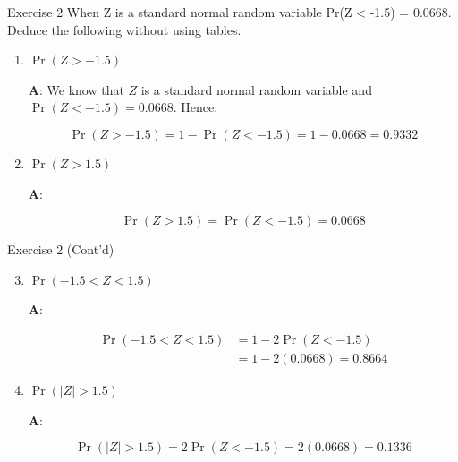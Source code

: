 \documentclass[
  ignorenonframetext,
  aspectratio=43,
]{beamer}
\let\olditem\item
\renewcommand\item{\olditem\justifying}
\begin{document}
\begin{frame}{Exercise 2}
\protect\hypertarget{exercise-2}{}
When Z is a standard normal random variable Pr(Z \textless{} -1.5) =
0.0668. Deduce the following without using tables.

\begin{enumerate}
\item
  \(\Pr(Z > -1.5)\)

  \pause

  \textbf{A}: We know that \(Z\) is a standard normal random variable
  and \(\Pr(Z < -1.5) = 0.0668\). Hence: \vspace{-15pt}

  \[
  \Pr(Z > -1.5) = 1 - \Pr(Z < -1.5) = 1 - 0.0668 = 0.9332
  \]
\item
  \(\Pr(Z > 1.5)\)

  \pause

  \textbf{A}: \vspace{-15pt}

  \[  
  \Pr(Z > 1.5) = \Pr(Z < -1.5) = 0.0668
  \]
\end{enumerate}
\end{frame}

\begin{frame}{Exercise 2 (Cont'd)}
\protect\hypertarget{exercise-2-contd}{}
\begin{enumerate}
\setcounter{enumi}{2}
\item
  \(\Pr(-1.5 < Z < 1.5)\)

  \pause

  \textbf{A}: \vspace{-15pt}

  \[
  \begin{aligned}
  \Pr(-1.5 < Z < 1.5) &= 1 - 2 \Pr(Z < -1.5) \\ 
                      &= 1 - 2(0.0668) = 0.8664
  \end{aligned}
  \]
\item
  \(\Pr(|Z| > 1.5)\)

  \pause

  \textbf{A}: \vspace{-20pt}

  \[
  \Pr(|Z| > 1.5) = 2 \Pr(Z < -1.5) = 2(0.0668) = 0.1336
  \]
\end{enumerate}
\end{frame}
\end{document}
